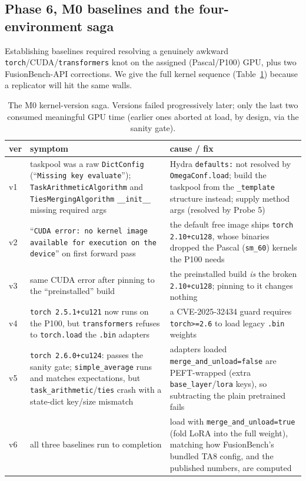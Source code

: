 \documentclass[11pt]{article}
\begin{document}
\subsection{Phase 6, M0 baselines and the four-environment saga}
\label{app:m0saga}
Establishing baselines required resolving a genuinely awkward \texttt{torch}/CUDA/\texttt{transformers}
knot on the assigned (Pascal/P100) GPU, plus two FusionBench-API corrections. We give the full kernel
sequence (Table~\ref{tab:m0saga}) because a replicator will hit the same walls.

\begin{table}[h]
\centering
\caption{The M0 kernel-version saga. Versions failed progressively later; only the last two consumed
meaningful GPU time (earlier ones aborted at load, by design, via the sanity gate).}
\label{tab:m0saga}
\small
\begin{tabular}{p{0.6cm} p{6.3cm} p{7.4cm}}
\toprule
ver & symptom & cause / fix \\
\midrule
v1 & taskpool was a raw \texttt{DictConfig} (``\texttt{Missing key evaluate}''); \texttt{TaskArithmeticAlgorithm}
and \texttt{TiesMergingAlgorithm} \texttt{\_\_init\_\_} missing required args & Hydra \texttt{defaults:}
not resolved by \texttt{OmegaConf.load}; build the taskpool from the \texttt{\_template} structure
instead; supply method args (resolved by Probe 5) \\
v2 & ``\texttt{CUDA error: no kernel image available for execution on the device}'' on first forward pass
& the default free image ships \texttt{torch 2.10+cu128}, whose binaries dropped the Pascal
(\texttt{sm\_60}) kernels the P100 needs \\
v3 & same CUDA error after pinning to the ``preinstalled'' build & the preinstalled build \emph{is} the
broken \texttt{2.10+cu128}; pinning to it changes nothing \\
v4 & \texttt{torch 2.5.1+cu121} now runs on the P100, but \texttt{transformers} refuses to
\texttt{torch.load} the \texttt{.bin} adapters & a CVE-2025-32434 guard requires \texttt{torch>=2.6} to
load legacy \texttt{.bin} weights \\
v5 & \texttt{torch 2.6.0+cu124}: passes the sanity gate; \texttt{simple\_average} runs and matches
expectations, but \texttt{task\_arithmetic}/\texttt{ties} crash with a state-dict key/size mismatch &
adapters loaded \texttt{merge\_and\_unload=false} are PEFT-wrapped (extra \texttt{base\_layer}/\texttt{lora}
keys), so subtracting the plain pretrained fails \\
v6 & all three baselines run to completion & load with \texttt{merge\_and\_unload=true} (fold LoRA into
the full weight), matching how FusionBench's bundled TA8 config, and the published numbers, are computed \\
\bottomrule
\end{tabular}
\end{table}
\end{document}

